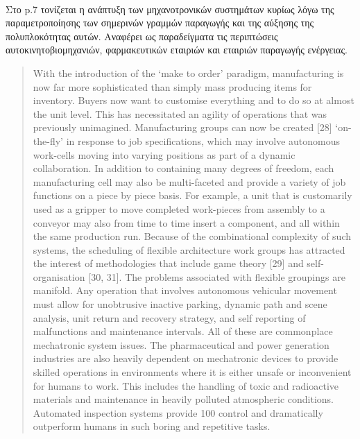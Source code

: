 \documentclass[a4paper,12pt,twoside]{report}
\begin{document}
{		\paragraph{}{Στο \cite{MechatronicsInActionCaseStudiesInMechatronics:Bradley2010} p.7 τονίζεται η ανάπτυξη των μηχανοτρονικών συστημάτων κυρίως λόγω της παραμετροποίησης των σημερινών γραμμών  παραγωγής και της αύξησης της πολυπλοκότητας αυτών. Αναφέρει ως παραδείγματα τις περιπτώσεις αυτοκινητοβιομηχανιών, φαρμακευτικών εταιριών και εταιριών παραγωγής ενέργειας.
		\begin{quote}		
		 With the introduction of the ‘make to order’ paradigm, manufacturing is now
far more sophisticated than simply mass producing items for inventory. Buyers
now want to customise everything and to do so at almost the unit level. This has
necessitated an agility of operations that was previously unimagined.
Manufacturing groups can now be created [28] ‘on-the-fly’ in response to job
specifications, which may involve autonomous work-cells moving into varying
positions as part of a dynamic collaboration. In addition to containing many
degrees of freedom, each manufacturing cell may also be multi-faceted and
provide a variety of job functions on a piece by piece basis. For example, a unit
that is customarily used as a gripper to move completed work-pieces from
assembly to a conveyor may also from time to time insert a component, and all
within the same production run.
Because of the combinational complexity of such systems, the scheduling of
flexible architecture work groups has attracted the interest of methodologies that
include game theory [29] and self-organisation [30, 31]. The problems associated
with flexible groupings are manifold. Any operation that involves autonomous
vehicular movement must allow for unobtrusive inactive parking, dynamic path
and scene analysis, unit return and recovery strategy, and self reporting of
malfunctions and maintenance intervals. All of these are commonplace
mechatronic system issues.
The pharmaceutical and power generation industries are also heavily
dependent on mechatronic devices to provide skilled operations in environments
where it is either unsafe or inconvenient for humans to work. This includes the
handling of toxic and radioactive materials and maintenance in heavily polluted
atmospheric conditions. Automated inspection systems provide 100%
control and dramatically outperform humans in such boring and repetitive tasks.
		\end{quote}
		\cite{DesignPrinciplesOfReconfigurableMachines:Reuven2007}
		}
		
}
\end{document}

